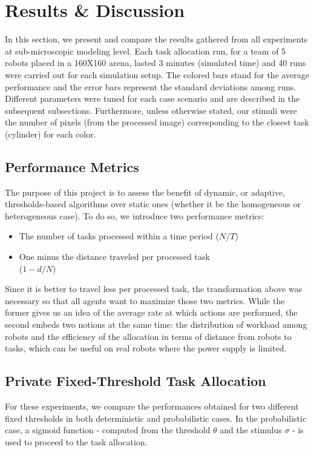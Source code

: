 \section{Results \& Discussion}
In this section, we present and compare the results gathered from all experiments at sub-microscopic modeling level. Each task allocation run, for a team of 5 robots placed in a 160X160 arena, lasted 3 minutes (simulated time) and 40 runs were carried out for each simulation setup. The colored bars stand for the average performance and the error bars represent the standard deviations among runs. Different parameters were tuned for each case scenario and are described in the subsequent subsections. Furthermore, unless otherwise stated, our stimuli were the number of pixels (from the processed image) corresponding to the closest task (cylinder) for each color.

\subsection{Performance Metrics}
The purpose of this project is to assess the benefit of dynamic, or adaptive, thresholds-based algorithms over static ones (whether it be the homogeneous or heterogeneous case). To do so, we introduce two performance metrics:
\begin{itemize}
	\item The number of tasks processed within a time period ($N/T$)
	\item One minus the distance traveled per processed task \\ ($1-d/N$)
\end{itemize}  
Since it is better to travel less per processed task, the transformation above was necessary so that all agents want to maximize those two metrics. 
While the former gives us an idea of the average rate at which actions are performed, the second embeds two notions at the same time: the distribution of workload among robots and the efficiency of the allocation in terms of distance from robots to tasks, which can be useful on real robots where the power supply is limited.

\subsection{Private Fixed-Threshold Task Allocation}
For these experiments, we compare the performances obtained for two different fixed thresholds in both deterministic and probabilistic cases. In the probabilistic case, a sigmoid function - computed from the threshold $\theta$ and the stimulus $\sigma$ - is used to proceed to the task allocation.

